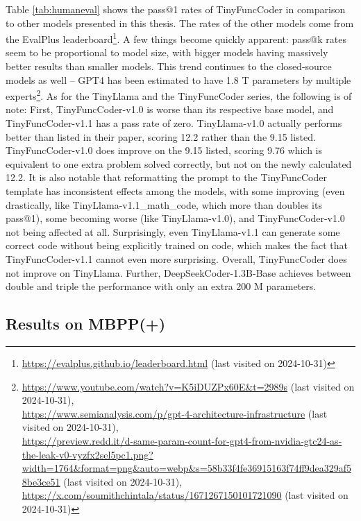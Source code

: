 Table \ref{tab:humaneval} shows the pass@1 rates of TinyFuncCoder in comparison to other models presented in this thesis.
The rates of the other models come from the EvalPlus leaderboard\footnote{\url{https://evalplus.github.io/leaderboard.html} (last visited on 2024-10-31)}.
A few things become quickly apparent: pass@k rates seem to be proportional to model size, with bigger models having massively better results than smaller models.
This trend continues to the closed-source models as well -- GPT4 has been estimated to have 1.8 T parameters by multiple experts\footnote{\url{https://www.youtube.com/watch?v=K5iDUZPx60E&t=2989s} (last visited on 2024-10-31),
\\\url{https://www.semianalysis.com/p/gpt-4-architecture-infrastructure} (last visited on 2024-10-31),
\\\url{https://preview.redd.it/d-same-param-count-for-gpt4-from-nvidia-gtc24-as-the-leak-v0-vyzfx2sel5pc1.png?width=1764&format=png&auto=webp&s=58b33f4fe36915163f74ff9dea329af58be3ce51} (last visited on 2024-10-31),
\\\url{https://x.com/soumithchintala/status/1671267150101721090} (last visited on 2024-10-31)}.
As for the TinyLlama and the TinyFuncCoder series, the following is of note:
First, TinyFuncCoder-v1.0 is worse than its respective base model, and TinyFuncCoder-v1.1 has a pass rate of zero.
TinyLlama-v1.0 actually performs better than listed in their paper, scoring 12.2 rather than the 9.15 listed.
TinyFuncCoder-v1.0 does improve on the 9.15 listed, scoring 9.76 which is equivalent to one extra problem solved correctly, but not on the newly calculated 12.2.
It is also notable that reformatting the prompt to the TinyFuncCoder template has inconsistent effects among the models, with some improving (even drastically, like TinyLlama-v1.1\_math\_code, which more than doubles its pass@1), some becoming worse (like TinyLlama-v1.0), and TinyFuncCoder-v1.0 not being affected at all.
Surprisingly, even TinyLlama-v1.1 can generate some correct code without being explicitly trained on code, which makes the fact that TinyFuncCoder-v1.1 cannot even more surprising.
Overall, TinyFuncCoder does not improve on TinyLlama.
Further, DeepSeekCoder-1.3B-Base achieves between double and triple the performance with only an extra 200 M parameters.


\subsection{Results on MBPP(+)}
\label{sec:mbppres}

